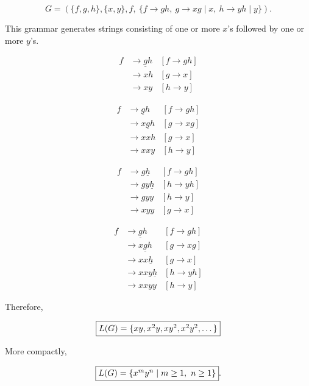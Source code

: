 \documentclass[12pt,a4paper,openany]{article}
\begin{document}
\[
G = ( \{f,g,h\}, \{x,y\}, f,\ 
   \{ f \to gh,\ g \to xg \mid x,\ h \to yh \mid y \} ).
\]

This grammar generates strings consisting of one or more $x$'s followed by 
one or more $y$'s. 

\noindent
\begin{minipage}[t]{0.48\textwidth}
\[
\begin{aligned}
f &\to \underline{g}h & [f \to gh] \\
              &\to xh               & [g \to x] \\
              &\to xy               & [h \to y]
\end{aligned}
\]

\[
\begin{aligned}
f &\to \underline{g}h  & [f \to gh] \\
              &\to x\underline{g}h & [g \to xg] \\
              &\to xxh             & [g \to x] \\
              &\to xxy             & [h \to y]
\end{aligned}
\]
\end{minipage}
\hfill
\begin{minipage}[t]{0.48\textwidth}
\[
\begin{aligned}
f &\to g\underline{h}  & [f \to gh] \\
              &\to gy\underline{h} & [h \to yh] \\ 
              &\to gyy             & [h \to y] \\
              &\to xyy             & [g \to x]
\end{aligned}
\]

\[
\begin{aligned}
f &\to \underline{g}h   & [f \to gh] \\
              &\to x\underline{g}h  & [g \to xg] \\
              &\to xx\underline{h}  & [g \to x] \\
              &\to xxy\underline{h} & [h \to yh] \\
              &\to xxyy             & [h \to y]
\end{aligned}
\]
\end{minipage}

Therefore,

\[
\fbox{$L(G) = \{ xy, x^2y, xy^2, x^2y^2, \dots \}$}
\]

More compactly,

\[
\fbox{$L(G) = \{ x^m y^n \mid m \ge 1,\ n \ge 1 \}$}.
\]
\end{document}
